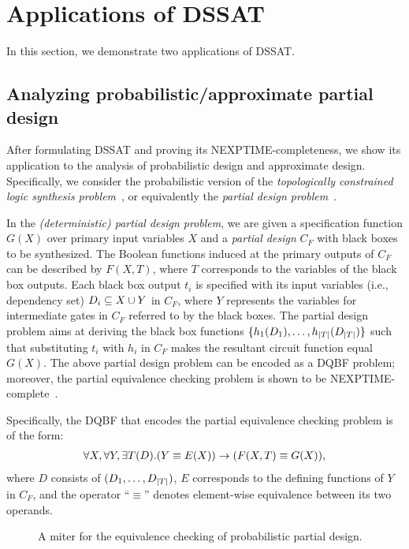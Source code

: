 \section{Applications of DSSAT}
\label{sect:dssat-application}

In this section, we demonstrate two applications of DSSAT.

\subsection{Analyzing probabilistic/approximate partial design}
After formulating DSSAT and proving its NEXPTIME-completeness,
we show its application to the analysis of probabilistic design and approximate design.
Specifically, we consider the probabilistic version of the \textit{topologically constrained logic synthesis problem}~\cite{Sinha2002,Balabanov2014},
or equivalently the \textit{partial design problem}~\cite{Gitina2013}.

In the \textit{(deterministic) partial design problem},
we are given a specification function $G(X)$ over primary input variables $X$ and
a \textit{partial design} $C_F$ with black boxes to be synthesized.
The Boolean functions induced at the primary outputs of $C_F$ can be described by $F(X,T)$,
where $T$ corresponds to the variables of the black box outputs.
Each black box output $t_i$ is specified with its input variables (i.e., dependency set) $D_{i}\subseteq X \cup Y$ in $C_F$,
where $Y$ represents the variables for intermediate gates in $C_F$ referred to by the black boxes.
The partial design problem aims at deriving the black box functions $\{h_1(D_{1}),\ldots,h_{|T|}(D_{|T|})\}$
such that substituting $t_i$ with $h_i$ in $C_F$ makes the resultant circuit function equal $G(X)$.
The above partial design problem can be encoded as a DQBF problem;
moreover, the partial equivalence checking problem is shown to be NEXPTIME-complete~\cite{Gitina2013}.

Specifically, the DQBF that encodes the partial equivalence checking problem is of the form:
\begin{align}
    \label{eq:dssat-dqbf-partial-design}
    \forall X,\forall Y,\exists T(D).(Y \equiv E(X)) \rightarrow (F(X,T)\equiv G(X)),
\end{align}
where $D$ consists of $(D_{1},\ldots,D_{|T|})$,
$E$ corresponds to the defining functions of $Y$ in $C_F$,
and the operator ``$\equiv$'' denotes element-wise equivalence between its two operands.

\begin{figure}[t]
    \centering
    
    \caption{A miter for the equivalence checking of probabilistic partial design.}
    \label{fig:dssat-prob-miter}
\end{figure}

